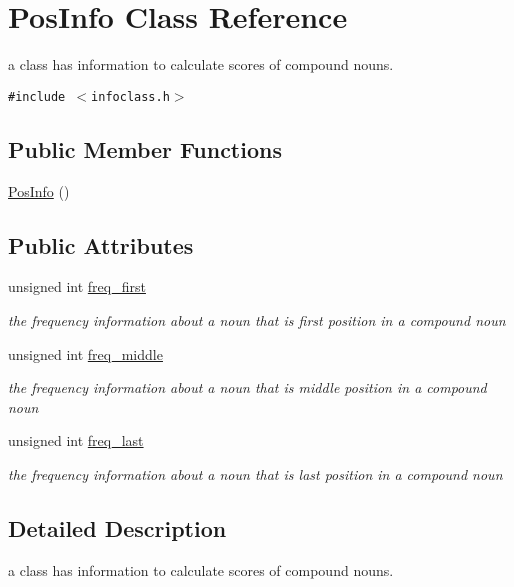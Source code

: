 \hypertarget{classPosInfo}{
\section{PosInfo Class Reference}
\label{classPosInfo}
}
a class has information to calculate scores of compound nouns.  


{\tt \#include $<$infoclass.h$>$}

\subsection*{Public Member Functions}
\begin{CompactItemize}
\item 
\hyperlink{classPosInfo_828283f9428c078fa1c7df2ef3f48e2d}{PosInfo} ()
\end{CompactItemize}
\subsection*{Public Attributes}
\begin{CompactItemize}
\item 
unsigned int \hyperlink{classPosInfo_dfbb5c662cb289ba7c53712757af4e7c}{freq\_\-first}
\begin{CompactList}\small\item\em the frequency information about a noun that is first position in a compound noun \item\end{CompactList}\item 
unsigned int \hyperlink{classPosInfo_b196ef658eb439010822780e260c6900}{freq\_\-middle}
\begin{CompactList}\small\item\em the frequency information about a noun that is middle position in a compound noun \item\end{CompactList}\item 
unsigned int \hyperlink{classPosInfo_becd8d727f72e68f80df7f00f29ca37d}{freq\_\-last}
\begin{CompactList}\small\item\em the frequency information about a noun that is last position in a compound noun \item\end{CompactList}\end{CompactItemize}


\subsection{Detailed Description}
a class has information to calculate scores of compound nouns. 

